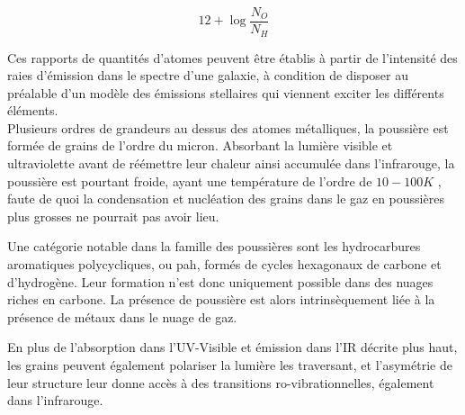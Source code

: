\documentclass[12pt, a4paper]{article}
\begin{document}
\begin{equation}
  \label{eq:abundance}
  12 + \log{\frac{N_O}{N_H}}
\end{equation}

Ces rapports de quantités d'atomes peuvent être établis à partir de l'intensité des raies d'émission dans le spectre d'une galaxie, à condition de disposer au préalable d'un modèle des émissions stellaires qui viennent exciter les différents éléments.\\

Plusieurs ordres de grandeurs au dessus des atomes métalliques, la poussière est formée de grains de l'ordre du micron. Absorbant la lumière visible et ultraviolette avant de réémettre leur chaleur ainsi accumulée dans l'infrarouge, la poussière est pourtant froide, ayant une température de l'ordre de $10 - 100K$ \parencite{Astrophysics-of-the-Diffuse-Universe}, faute de quoi la condensation et nucléation des grains dans le gaz en poussières plus grosses ne pourrait pas avoir lieu.

Une catégorie notable dans la famille des poussières sont les hydrocarbures aromatiques polycycliques, ou \gls{pah}, formés de cycles hexagonaux de carbone et d'hydrogène. Leur formation n'est donc uniquement possible dans des nuages riches en carbone. La présence de poussière est alors intrinsèquement liée à la présence de métaux dans le nuage de gaz.

En plus de l'absorption dans l'UV-Visible et émission dans l'IR décrite plus haut, les grains peuvent également polariser la lumière les traversant, et l'asymétrie de leur structure leur donne accès à des transitions ro-vibrationnelles, également dans l'infrarouge.\\
\end{document}
